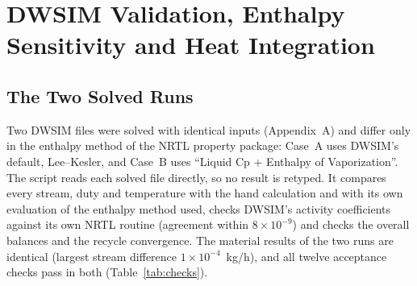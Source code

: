 \documentclass[10pt,a4paper]{article}
\begin{document}
\section{DWSIM Validation, Enthalpy Sensitivity and Heat Integration}

\subsection{The Two Solved Runs}

Two DWSIM files were solved with identical inputs (Appendix~A) and differ only in the enthalpy method of the NRTL property package: Case~A uses DWSIM's default, Lee--Kesler, and Case~B uses ``Liquid Cp + Enthalpy of Vaporization''. The script reads each solved file directly, so no result is retyped. It compares every stream, duty and temperature with the hand calculation and with its own evaluation of the enthalpy method used, checks DWSIM's activity coefficients against its own NRTL routine (agreement within $8 \times 10^{-9}$) and checks the overall balances and the recycle convergence. The material results of the two runs are identical (largest stream difference $1 \times 10^{-4}$~kg/h), and all twelve acceptance checks pass in both (Table~\ref{tab:checks}).
\end{document}
